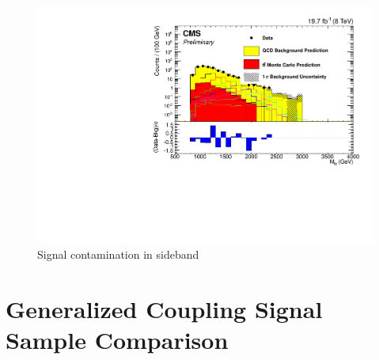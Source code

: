 \begin{figure}[Htcb]
\centering
\includegraphics[width=1.0\textwidth]{figs/NewMtbSB3semilogwithsignal.pdf}
\caption{Signal contamination in sideband}
\label{figs:sigSB3}
\end{figure}


\section{Generalized Coupling Signal Sample Comparison}
\label{sec:sigcont}

